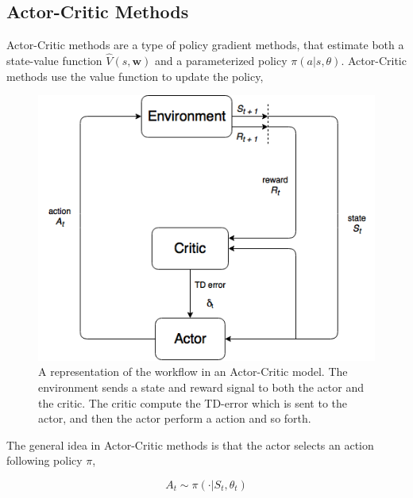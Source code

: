 \documentclass[11pt]{article}
\begin{document}
\subsection{Actor-Critic Methods}

Actor-Critic methods are a type of policy gradient methods, that estimate both a state-value function $\hat{V}(s, \mathbf{w})$ and a parameterized policy $\pi(a | s, \theta)$. Actor-Critic methods use the value function to update the policy,

\begin{figure}[!h]
    \centering
    \includegraphics[scale = 0.5]{include/ActorCriticDiagram.png}
    \caption{A representation of the workflow in an Actor-Critic
    model. The environment sends a state and reward signal to both the actor and the critic. The critic compute the TD-error which is sent to the actor,
and then the actor perform a action and so forth.}
    \label{fig:actor-critic}
\end{figure}

The general idea in Actor-Critic methods is that the actor selects an action following policy $\pi$,

\begin{equation}
    A_{t} \sim \pi(\cdot | S_{t}, \theta_{t})
\end{equation}
\end{document}
